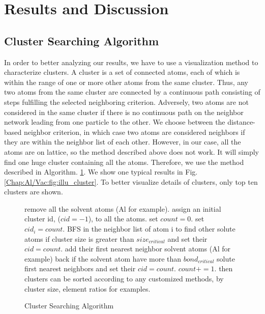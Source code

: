 \section{Results and Discussion}
\label{Chap:Al/Vac:section:RD}
\subsection{Cluster Searching Algorithm}

In order to better analyzing our results, we have to use a visualization method to characterize clusters. A cluster is a set of connected atoms, each of which is within the range of one or more other atoms from the same cluster. Thus, any two atoms from the same cluster are connected by a continuous path consisting of steps fulfilling the selected neighboring criterion. Adversely, two atoms are not considered in the same cluster if there is no continuous path on the neighbor network leading from one particle to the other. We choose between the distance-based neighbor criterion, in which case two atoms are considered neighbors if they are within the neighbor list of each other. However, in our case, all the atoms are on lattice, so the method described above does not work. It will simply find one huge cluster containing all the atoms. Therefore, we use the method described in Algorithm. \ref{algo:cluster}. We show one typical results in Fig. \ref{Chap:Al/Vac:fig:illu_cluster}. To better visualize details of clusters,  only top ten clusters are shown. 


\begin{figure}[!htb]
  \centering
  \begin{minipage}{.75\linewidth}
    \begin{algorithm}[H]
      \caption{Cluster Searching Algorithm}\label{algo:cluster}
      \begin{algorithmic}[1]
        \State remove all the solvent atoms (Al for example).
        \State assign an initial cluster id, ($cid = -1$), to all the atoms.
        \State set $count = 0$.
            \State set $cid_i = count$.
            \State \ac{BFS} in the neighbor list of atom i to find other solute atoms if cluster size is greater than $size_{critical}$ and set their $cid = count$.
            \State add their first nearest neighbor solvent atoms (Al for example) back if the solvent atom have more than $bond_{critical}$ solute first nearest neighbors and set their $cid = count$.
            \State $count += 1$.
          \EndIf
        \EndFor
        \State then clusters can be sorted according to any customized methods, by cluster size, element ratios for examples.
      \end{algorithmic}
    \end{algorithm}
  \end{minipage}
\end{figure}


